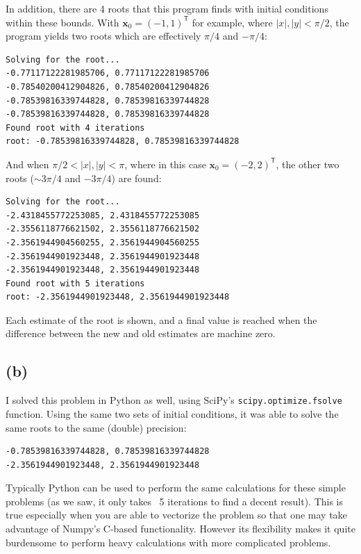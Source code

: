 \documentclass[12pt]{article}
\begin{document}
In addition, there are 4 roots that this program finds with initial conditions
within these bounds. With $\boldsymbol{x}_0 = (-1, 1)^\mathsf{T}$ for example,
where $|x|, |y| < \pi / 2$, the program yields two roots which are effectively
$\pi/4$ and $-\pi/4$:
\begin{verbatim}
Solving for the root...
-0.77117122281985706, 0.77117122281985706
-0.78540200412904826, 0.78540200412904826
-0.78539816339744828, 0.78539816339744828
-0.78539816339744828, 0.78539816339744828
Found root with 4 iterations
root: -0.78539816339744828, 0.78539816339744828
\end{verbatim}
And when $\pi / 2 < |x|, |y| < \pi$, where in this case $\boldsymbol{x}_0 =
(-2, 2)^\mathsf{T}$, the other two roots ($\sim 3\pi/4$ and $-3\pi/4$) are
found:
\begin{verbatim}
Solving for the root...
-2.4318455772253085, 2.4318455772253085
-2.3556118776621502, 2.3556118776621502
-2.3561944904560255, 2.3561944904560255
-2.3561944901923448, 2.3561944901923448
-2.3561944901923448, 2.3561944901923448
Found root with 5 iterations
root: -2.3561944901923448, 2.3561944901923448
\end{verbatim}

Each estimate of the root is shown, and a final value is reached when the
difference between the new and old estimates are machine zero.

\subsection*{(b)}

I solved this problem in Python as well, using SciPy's
\texttt{scipy.optimize.fsolve} function. Using the same two sets of initial
conditions, it was able to solve the same roots to the same (double) precision:
\begin{verbatim}
-0.78539816339744828, 0.78539816339744828
-2.3561944901923448, 2.3561944901923448
\end{verbatim}

Typically Python can be used to perform the same calculations for these simple
problems (as we saw, it only takes ~5 iterations to find a decent result). This
is true especially when you are able to vectorize the problem so that one may
take advantage of Numpy's C-based functionality. However its flexibility makes
it quite burdensome to perform heavy calculations with more complicated
problems.
\end{document}
